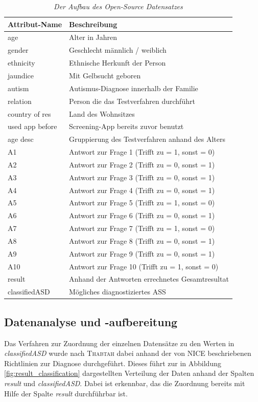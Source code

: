 \documentclass[conference]{IEEEtran}
\begin{document}
\begin{table}[htbp]
\begin{tabular}{l p{6cm}}
\textbf{Attribut-Name} & \textbf{Beschreibung}\\ \hline
age & Alter in Jahren\\
gender & Geschlecht männlich / weiblich\\
ethnicity & Ethnische Herkunft der Person\\
jaundice	 & Mit Gelbsucht geboren\\
autism & Autismus-Diagnose innerhalb der Familie\\
relation & Person die das Testverfahren durchführt\\
country of res & Land des Wohnsitzes  \\
used app before & Screening-App bereits zuvor benutzt\\
age desc & Gruppierung des Testverfahren anhand des Alters\\
A1 & Antwort zur Frage 1 (Trifft zu = 1, sonst = 0)\\
A2 & Antwort zur Frage 2 (Trifft zu = 0, sonst = 1)\\
A3 & Antwort zur Frage 3 (Trifft zu = 0, sonst = 1)\\
A4 & Antwort zur Frage 4 (Trifft zu = 0, sonst = 1)\\
A5 & Antwort zur Frage 5 (Trifft zu = 1, sonst = 0)\\
A6 & Antwort zur Frage 6 (Trifft zu = 0, sonst = 1)\\
A7 & Antwort zur Frage 7 (Trifft zu = 1, sonst = 0)\\
A8 & Antwort zur Frage 8 (Trifft zu = 0, sonst = 1)\\
A9 & Antwort zur Frage 9 (Trifft zu = 0, sonst = 1)\\
A10 & Antwort zur Frage 10 (Trifft zu = 1, sonst = 0)\\
result & Anhand der Antworten errechnetes Gesamtresultat\\
classifiedASD & Mögliches diagnostiziertes ASS\\
\end{tabular}
\centering
\label{tbl:datensatz}
\caption{\em Der Aufbau des Open-Source Datensatzes}
\end{table}

\subsection{Datenanalyse und -aufbereitung} \label{sec:analysis}
Das Verfahren zur Zuordnung der einzelnen Datensätze zu den Werten in \textit{classifiedASD} wurde nach \textsc{Thabtah} \cite{Thabtah2017} dabei anhand der von \textsc{NICE} \cite{NICE2012} beschriebenen Richtlinien zur Diagnose durchgeführt. Dieses führt zur in Abbildung \ref{fig:result_classification} dargestellten Verteilung der Daten anhand der Spalten \textit{result} und \textit{classifiedASD}. Dabei ist erkennbar, das die Zuordnung bereits mit Hilfe der Spalte \textit{result} durchführbar ist.
\end{document}
